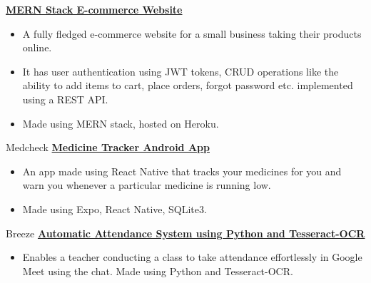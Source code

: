 {\href{https://czcreation.onrender.com/}{\textbf{MERN Stack E-commerce Website}}}
{
    \begin{itemize}
        \item A fully fledged e-commerce website for a small business taking their products online.
        \item It has user authentication using JWT tokens, CRUD operations like the ability to add items to cart, place orders, forgot password etc. implemented using a REST API.
        \item Made using MERN stack, hosted on Heroku.
    \end{itemize}
}
{Medcheck}
{\href{https://github.com/confumbit/medcheck}{\textbf{Medicine Tracker Android App}}}
{
    \begin{itemize}
        \item An app made using React Native that tracks your medicines for you and warn you whenever a particular medicine is running low.
        \item Made using Expo, React Native, SQLite3.
    \end{itemize}
}
{Breeze}
{\href{https://github.com/confumbit/Breeze}{\textbf{Automatic Attendance System using Python and
            Tesseract-OCR}}}
{
    \begin{itemize}
        \item Enables a teacher conducting a class to take attendance effortlessly in Google Meet using the chat. Made using Python and Tesseract-OCR.
    \end{itemize}
}